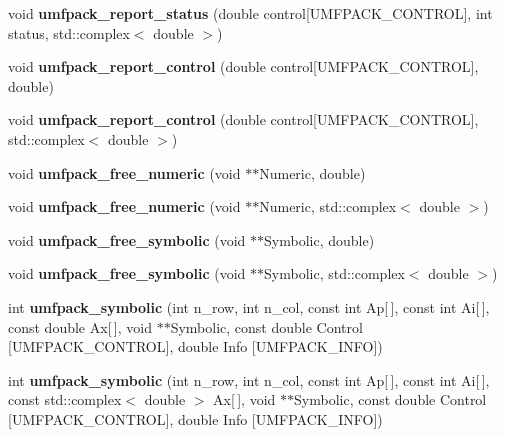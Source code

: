 \begin{DoxyCompactItemize}
void {\bfseries umfpack\+\_\+report\+\_\+status} (double control\mbox{[}U\+M\+F\+P\+A\+C\+K\+\_\+\+C\+O\+N\+T\+R\+OL\mbox{]}, int status, std\+::complex$<$ double $>$)
\item 
\mbox{\label{namespace_eigen_a2223760c7ddf708305b7abb124e410c4}} 
void {\bfseries umfpack\+\_\+report\+\_\+control} (double control\mbox{[}U\+M\+F\+P\+A\+C\+K\+\_\+\+C\+O\+N\+T\+R\+OL\mbox{]}, double)
\item 
\mbox{\label{namespace_eigen_a1aaed1c7c174d75c79528d1e02d69d57}} 
void {\bfseries umfpack\+\_\+report\+\_\+control} (double control\mbox{[}U\+M\+F\+P\+A\+C\+K\+\_\+\+C\+O\+N\+T\+R\+OL\mbox{]}, std\+::complex$<$ double $>$)
\item 
\mbox{\label{namespace_eigen_a3b1224272137249b08cfa93a27fe740d}} 
void {\bfseries umfpack\+\_\+free\+\_\+numeric} (void $\ast$$\ast$Numeric, double)
\item 
\mbox{\label{namespace_eigen_a0580101162af21395b9f4e5c9b8e7304}} 
void {\bfseries umfpack\+\_\+free\+\_\+numeric} (void $\ast$$\ast$Numeric, std\+::complex$<$ double $>$)
\item 
\mbox{\label{namespace_eigen_aca848a572692372a17c2e418ad49cec1}} 
void {\bfseries umfpack\+\_\+free\+\_\+symbolic} (void $\ast$$\ast$Symbolic, double)
\item 
\mbox{\label{namespace_eigen_aed444e5cae1f6cb723e30b5a675a90d0}} 
void {\bfseries umfpack\+\_\+free\+\_\+symbolic} (void $\ast$$\ast$Symbolic, std\+::complex$<$ double $>$)
\item 
\mbox{\label{namespace_eigen_a093d6099185afc4102643f91c3ecb56b}} 
int {\bfseries umfpack\+\_\+symbolic} (int n\+\_\+row, int n\+\_\+col, const int Ap\mbox{[}$\,$\mbox{]}, const int Ai\mbox{[}$\,$\mbox{]}, const double Ax\mbox{[}$\,$\mbox{]}, void $\ast$$\ast$Symbolic, const double Control \mbox{[}U\+M\+F\+P\+A\+C\+K\+\_\+\+C\+O\+N\+T\+R\+OL\mbox{]}, double Info \mbox{[}U\+M\+F\+P\+A\+C\+K\+\_\+\+I\+N\+FO\mbox{]})
\item 
\mbox{\label{namespace_eigen_a9442636873c88827208a90786f13f1bf}} 
int {\bfseries umfpack\+\_\+symbolic} (int n\+\_\+row, int n\+\_\+col, const int Ap\mbox{[}$\,$\mbox{]}, const int Ai\mbox{[}$\,$\mbox{]}, const std\+::complex$<$ double $>$ Ax\mbox{[}$\,$\mbox{]}, void $\ast$$\ast$Symbolic, const double Control \mbox{[}U\+M\+F\+P\+A\+C\+K\+\_\+\+C\+O\+N\+T\+R\+OL\mbox{]}, double Info \mbox{[}U\+M\+F\+P\+A\+C\+K\+\_\+\+I\+N\+FO\mbox{]})

\end{DoxyCompactItemize}
